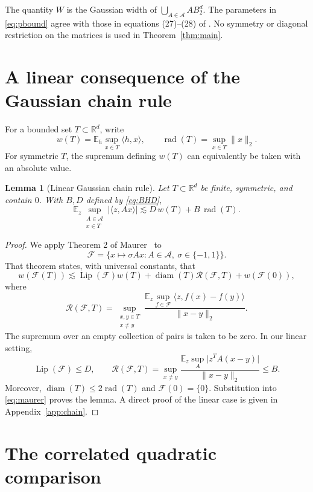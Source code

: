 \documentclass[10pt,a4paper]{amsart}
\numberwithin{equation}{section}
\newtheorem{lemma}[theorem]{Lemma}
\newcommand{\E}{\mathbb E}
\newcommand{\R}{\mathbb R}
\newcommand{\cA}{\mathcal A}
\newcommand{\cF}{\mathcal F}
\newcommand{\norm}[1]{\lVert #1\rVert}
\newcommand{\abs}[1]{\lvert #1\rvert}
\newcommand{\ip}[2]{\langle #1,#2\rangle}
\newcommand{\rad}{\operatorname{rad}}
\newcommand{\diam}{\operatorname{diam}}
\newcommand{\Lip}{\operatorname{Lip}}
\begin{document}
The quantity $W$ is the Gaussian width of $\bigcup_{A\in\cA}AB_2^d$. The parameters in \eqref{eq:pbound} agree with those in equations (27)--(28) of \cite{ALM}. No symmetry or diagonal restriction on the matrices is used in Theorem~\ref{thm:main}.

\section{A linear consequence of the Gaussian chain rule}

For a bounded set $T\subset\R^d$, write
\[
 w(T)=\E_h\sup_{x\in T}\ip{h}{x},
 \qquad \rad(T)=\sup_{x\in T}\norm{x}_2.
\]
For symmetric $T$, the supremum defining $w(T)$ can equivalently be taken with an absolute value.

\begin{lemma}[Linear Gaussian chain rule]\label{lem:chain}
Let $T\subset\R^d$ be finite, symmetric, and contain $0$. With $B,D$ defined by \eqref{eq:BHD},
\begin{equation}
 \E_z\sup_{\substack{A\in\cA\\x\in T}}\abs{\ip{z}{Ax}}
 \lesssim D\,w(T)+B\,\rad(T).
 \label{eq:linear-chain}
\end{equation}
\end{lemma}

\begin{proof}
We apply Theorem 2 of Maurer~\cite{Maurer} to
\[
 \cF=\{x\mapsto \sigma Ax:A\in\cA,\ \sigma\in\{-1,1\}\}.
\]
That theorem states, with universal constants, that
\begin{equation}
 w(\cF(T))\lesssim
 \Lip(\cF)w(T)+\diam(T)\mathcal R(\cF,T)+w(\cF(0)),
 \label{eq:maurer}
\end{equation}
where
\[
 \mathcal R(\cF,T)=
 \sup_{\substack{x,y\in T\\x\ne y}}
 \frac{\E_z\sup_{f\in\cF}\ip{z}{f(x)-f(y)}}{\norm{x-y}_2}.
\]
The supremum over an empty collection of pairs is taken to be zero. In our linear setting,
\[
 \Lip(\cF)\le D,
 \qquad
 \mathcal R(\cF,T)
 =\sup_{x\ne y}\frac{\E_z\sup_A\abs{z^TA(x-y)}}{\norm{x-y}_2}
 \le B.
\]
Moreover, $\diam(T)\le2\rad(T)$ and $\cF(0)=\{0\}$. Substitution into \eqref{eq:maurer} proves the lemma. A direct proof of the linear case is given in Appendix~\ref{app:chain}.
\end{proof}

\section{The correlated quadratic comparison}
\end{document}
